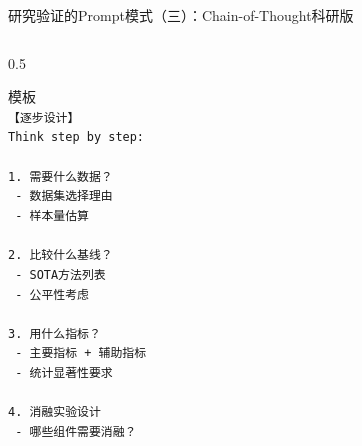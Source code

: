 \documentclass[aspectratio=169,11pt]{beamer}
\begin{document}
\begin{frame}[fragile]{研究验证的Prompt模式（三）：Chain-of-Thought科研版}
\begin{columns}
\begin{column}{0.5\textwidth}
\begin{exampleblock}{模板}
                \texttt{}\\
                \texttt{【逐步设计】}\\
                \texttt{Think step by step:}\\
                \texttt{}\\
                \texttt{1. 需要什么数据？}\\
                \texttt{   - 数据集选择理由}\\
                \texttt{   - 样本量估算}\\
                \texttt{}\\
                \texttt{2. 比较什么基线？}\\
                \texttt{   - SOTA方法列表}\\
                \texttt{   - 公平性考虑}\\
                \texttt{}\\
                \texttt{3. 用什么指标？}\\
                \texttt{   - 主要指标 + 辅助指标}\\
                \texttt{   - 统计显著性要求}\\
                \texttt{}\\
                \texttt{4. 消融实验设计}\\
                \texttt{   - 哪些组件需要消融？}
            \end{exampleblock}
        \end{column}
    \end{columns}
\end{frame}
\end{document}
